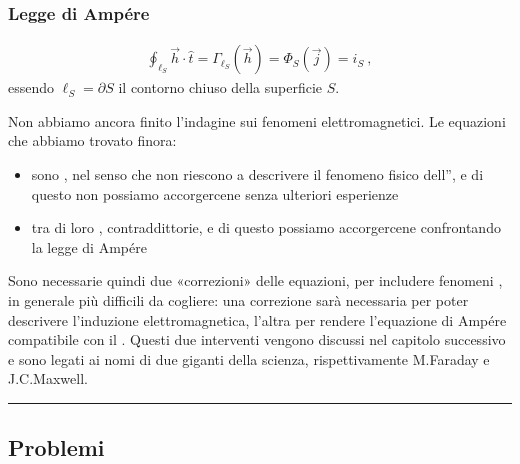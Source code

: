 \documentclass[letterpaper,10pt,italian]{jupyterBook}
\begin{document}
\subsubsection{Legge di Ampére}
\label{\detokenize{ch/electromagnetism/electromagnetism-steady:legge-di-ampere}}\label{\detokenize{ch/electromagnetism/electromagnetism-steady:physics-hs-electromagnetism-electromagnetism-steady-maxwell-ampere}}\begin{equation*}
\begin{split}\oint_{\ell_S} \vec{h} \cdot \hat{t} = \Gamma_{\ell_S}(\vec{h}) = \Phi_{S}(\vec{j}) = i_S \ ,\end{split}
\end{equation*}
\sphinxAtStartPar
essendo \(\ell_S = \partial S\) il contorno \sphinxhyphen{} chiuso \sphinxhyphen{} della superficie \(S\).

\sphinxAtStartPar
Non abbiamo ancora finito l’indagine sui fenomeni elettromagnetici. Le equazioni che abbiamo trovato finora:
\begin{itemize}
\item {} 
\sphinxAtStartPar
sono , nel senso che non riescono a descrivere il fenomeno fisico dell”{\hyperref[\detokenize{ch/electromagnetism/electromagnetism-general:physics-hs-electromagnetism-electromagnetism-general-em-induction}]{}}, e di questo non possiamo accorgercene senza ulteriori esperienze

\item {} 
\sphinxAtStartPar
tra di loro , contraddittorie, e di questo possiamo accorgercene confrontando la legge di Ampére

\end{itemize}

\sphinxAtStartPar
Sono necessarie quindi due «correzioni» delle equazioni, per includere fenomeni , in generale più difficili da cogliere: una correzione sarà necessaria per poter descrivere l’induzione elettromagnetica, l’altra per rendere l’equazione di Ampére compatibile con il . Questi due interventi vengono discussi nel capitolo successivo e sono legati ai nomi di due giganti della scienza, rispettivamente M.Faraday e J.C.Maxwell.


\bigskip\hrule\bigskip


\sphinxstepscope


\subsection{Problemi}
\label{\detokenize{ch/electromagnetism/electromagnetism-steady-problems:problemi}}\label{\detokenize{ch/electromagnetism/electromagnetism-steady-problems:physics-hs-electromagnetism-electromagnetism-steady-problems}}\label{\detokenize{ch/electromagnetism/electromagnetism-steady-problems::doc}}
\end{document}

